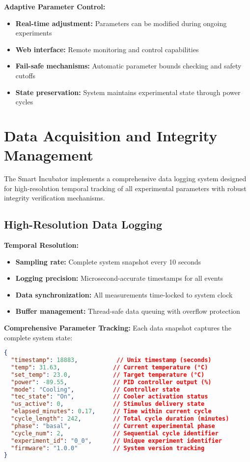 \documentclass[11pt,a4paper]{article}
\begin{document}
\textbf{Adaptive Parameter Control:}
\begin{itemize}
\item \textbf{Real-time adjustment:} Parameters can be modified during ongoing experiments
\item \textbf{Web interface:} Remote monitoring and control capabilities
\item \textbf{Fail-safe mechanisms:} Automatic parameter bounds checking and safety cutoffs
\item \textbf{State preservation:} System maintains experimental state through power cycles
\end{itemize}

\section{Data Acquisition and Integrity Management}

The Smart Incubator implements a comprehensive data logging system designed for high-resolution temporal tracking of all experimental parameters with robust integrity verification mechanisms.

\subsection{High-Resolution Data Logging}

\textbf{Temporal Resolution:}
\begin{itemize}
\item \textbf{Sampling rate:} Complete system snapshot every 10 seconds
\item \textbf{Logging precision:} Microsecond-accurate timestamps for all events
\item \textbf{Data synchronization:} All measurements time-locked to system clock
\item \textbf{Buffer management:} Thread-safe data queuing with overflow protection
\end{itemize}

\textbf{Comprehensive Parameter Tracking:}
Each data snapshot captures the complete system state:

\begin{lstlisting}[language=json,caption={Example data snapshot structure}]
{
  "timestamp": 18883,           // Unix timestamp (seconds)
  "temp": 31.63,               // Current temperature (°C)
  "set_temp": 23.0,            // Target temperature (°C)
  "power": -89.55,             // PID controller output (%)
  "mode": "Cooling",           // Controller state
  "tec_state": "On",           // Cooler activation status
  "us_active": 0,              // Stimulus delivery state
  "elapsed_minutes": 0.17,     // Time within current cycle
  "cycle_length": 242,         // Total cycle duration (minutes)
  "phase": "basal",            // Current experimental phase
  "cycle_num": 2,              // Sequential cycle identifier
  "experiment_id": "0_0",      // Unique experiment identifier
  "firmware": "1.0.0"          // System version tracking
}
\end{lstlisting}
\end{document}
